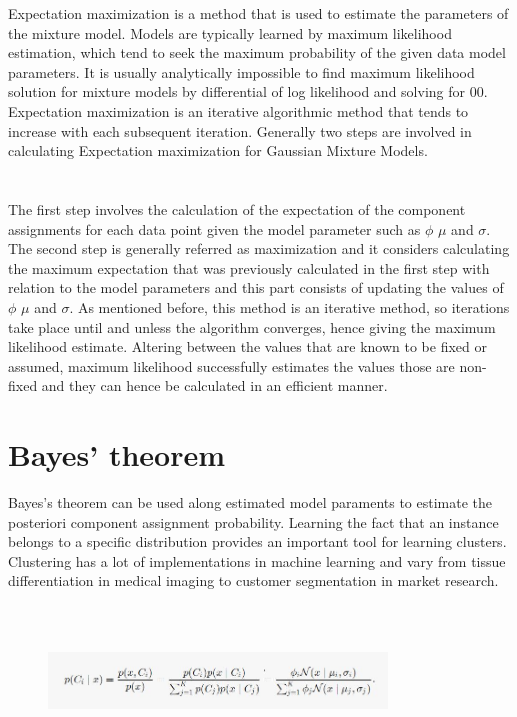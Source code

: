 \documentclass[conference]{IEEEtran}
\begin{document}
Expectation maximization is a method that is used to estimate the parameters of the mixture model. Models are typically learned by maximum likelihood estimation, which tend to seek the maximum probability of the given data model parameters. It is usually analytically impossible to find maximum likelihood solution for mixture models by differential of log likelihood and solving for 00.\\
Expectation maximization is an iterative algorithmic method that tends to increase with each subsequent iteration. Generally two steps are involved in calculating Expectation maximization for Gaussian Mixture Models.\\ \\ \\
The first step involves the calculation of the expectation of the component assignments for each data point given the model parameter such as $\phi$ $\mu$ and $\sigma$.\\





The second step is generally referred as maximization and it considers calculating the maximum expectation that was previously calculated in the first step with relation to the model parameters and this part consists of updating the values of $\phi$ $\mu$ and $\sigma$.
As mentioned before, this method is an iterative method, so iterations take place until and unless the algorithm converges, hence giving the maximum likelihood estimate. Altering between the values that are known to be fixed or assumed, maximum likelihood successfully estimates the values those are non-fixed and they can hence be calculated in an efficient manner.


\section{Bayes' theorem}

Bayes’s theorem can be used along estimated model paraments to estimate the posteriori component assignment probability. Learning the fact that an instance belongs to a specific distribution provides an important tool for learning clusters. Clustering has a lot of implementations in machine learning and vary from tissue differentiation in medical imaging to customer segmentation in market research. 

\begin{figure}[h]
    \centering
    \includegraphics[width=9cm,height=4cm]{emtwo.JPG}
    \end{figure}
\end{document}
